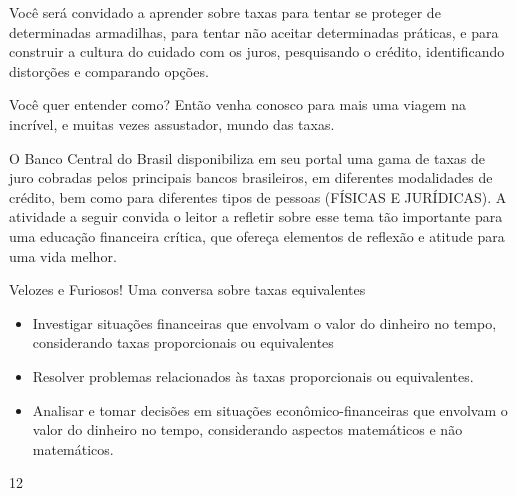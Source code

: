 Você será convidado a aprender sobre taxas para tentar se proteger de determinadas armadilhas, para tentar não aceitar determinadas práticas, e para construir a cultura do cuidado com os juros, pesquisando o crédito, identificando distorções e comparando opções.

Você quer entender como? Então venha conosco para mais uma viagem na incrível, e muitas vezes assustador, mundo das taxas.

O Banco Central do Brasil disponibiliza em seu portal uma gama de taxas de juro cobradas pelos principais bancos brasileiros, em diferentes modalidades de crédito, bem como para diferentes tipos de pessoas (FÍSICAS E JURÍDICAS). A atividade a seguir convida o leitor a refletir sobre esse tema tão importante para uma educação financeira crítica, que ofereça elementos de reflexão e atitude para uma vida melhor. 
\clearpage
\begin{objectives}{Velozes e Furiosos! Uma conversa sobre taxas equivalentes}
{
\begin{itemize}
\item Investigar situações financeiras que envolvam o valor do dinheiro no tempo, considerando taxas proporcionais ou equivalentes
\item Resolver problemas relacionados às taxas proporcionais ou equivalentes.
\item Analisar e tomar decisões em situações econômico-financeiras que envolvam o valor do dinheiro no tempo, considerando aspectos matemáticos e não matemáticos.
\end{itemize}
}{1}{2}
\end{objectives}
\marginpar{\vspace{-2.5em}}
